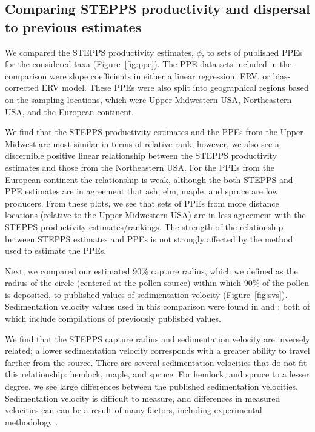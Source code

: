 \documentclass[12pt]{article}
\begin{document}
\subsection{Comparing STEPPS productivity and dispersal to previous
  estimates}

We compared the STEPPS productivity estimates, $\phi$, to sets of
published PPEs for the considered taxa (Figure~\ref{fig:ppe}). The PPE
data sets included in the comparison were slope coefficients in either
a linear regression, ERV, or bias-corrected ERV model. These PPEs were
also split into geographical regions based on the sampling locations,
which were Upper Midwestern USA, Northeastern USA, and the European
continent. %

We find that the STEPPS productivity estimates and the PPEs from the
Upper Midwest are most similar in terms of relative rank, however, we
also see a discernible positive linear relationship between the STEPPS
productivity estimates and those from the Northeastern USA. For the
PPEs from the European continent the relationship is weak, although
the both STEPPS and PPE estimates are in agreement that ash, elm,
maple, and spruce are low producers. From these plots, we see that
sets of PPEs from more distance locations (relative to the Upper
Midwestern USA) are in less agreement with the STEPPS productivity
estimates/rankings. The strength of the relationship between STEPPS
estimates and PPEs is not strongly affected by the method used to
estimate the PPEs.

Next, we compared our estimated 90\% capture radius, which we defined
as the radius of the circle (centered at the pollen source) within
which 90\% of the pollen is deposited, to published values of
sedimentation velocity (Figure~\ref{fig:svs}). Sedimentation velocity
values used in this comparison were found in \citet{jackson1999pollen}
and \citet{matthias2014insights}; both of which include compilations
of previously published values.


We find that the STEPPS capture radius and sedimentation velocity are
inversely related; a lower sedimentation velocity corresponds with a
greater ability to travel farther from the source. There are several
sedimentation velocities that do not fit this relationship: hemlock,
maple, and spruce. For hemlock, and spruce to a lesser degree, we see
large differences between the published sedimentation
velocities. Sedimentation velocity is difficult to measure, and
differences in measured velocities can can be a result of many
factors, including experimental methodology \citep{XXX}.
\end{document}
